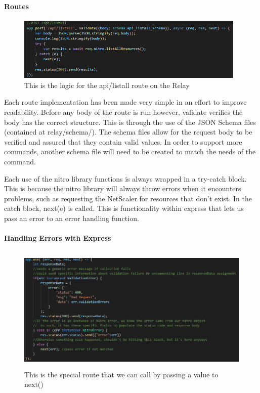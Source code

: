 \documentclass[onecolumn, draftclsnofoot,10pt, compsoc]{IEEEtran}
\begin{document}
    \paragraph{Routes}
    \begin{figure}[ht]
        \centering
        \includegraphics[height=3cm]{code8.png}
        \caption[Relay's Route Logic]{This is the logic for the api/listall route on the Relay}
        \label{fig:Relay's Route Logic}
    \end{figure}
    Each route implementation has been made very simple in an effort to improve readability.
    Before any body of the route is run however, validate verifies the body has the correct structure.
    This is through the use of the JSON Schema files (contained at relay/schema/).
    The schema files allow for the request body to be verified and assured that they contain valid values.
    In order to support more commands, another schema file will need to be created to match the needs of the command.
    
    Each use of the nitro library functions is always wrapped in a try-catch block.
    This is because the nitro library will always throw errors when it encounters problems, such as requesting the NetScaler for resources that don't exist.
    In the catch block, next(e) is called.
    This is functionality within express that lets us pass an error to an error handling function.
    
    \paragraph{Handling Errors with Express}
    \begin{figure}[ht]
        \centering
        \includegraphics[height=6cm]{code9.png}
        \caption[Handling Errors]{This is the special route that we can call by passing a value to next()}
        \label{fig:Handling Errors}
    \end{figure}
    
\end{document}
